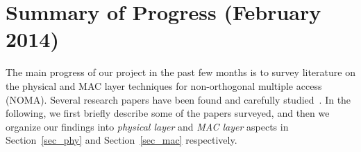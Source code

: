 \section{Summary of Progress (February 2014)}
\label{sec_introduction}

The main progress of our project in the past few months is to survey literature on the physical and
MAC layer techniques for non-orthogonal multiple access (NOMA). Several research
papers have been found and carefully studied~\cite{cite_docomo1, cite_docomo2, cite_docomo3,cite_bell1,cite_bell2}.
In the following, we first briefly describe some of the papers surveyed, and then we organize our findings into
{\em physical layer} and {\em MAC layer} aspects in Section~\ref{sec_phy} and
Section~\ref{sec_mac} respectively.


